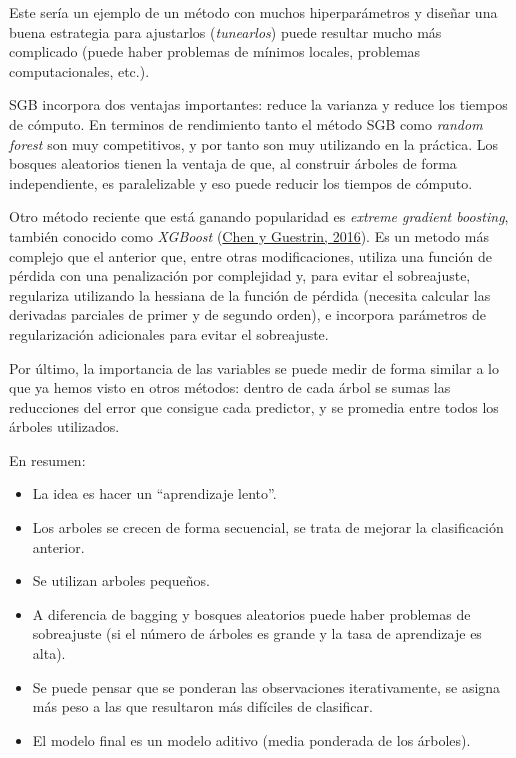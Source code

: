 \documentclass[
  spanish,
]{book}
\theoremstyle{break}
\theoremstyle{definition}
\theoremstyle{definition}
\theoremstyle{definition}
\theoremstyle{definition}
\theoremstyle{remark}
\begin{document}
Este sería un ejemplo de un método con muchos hiperparámetros y diseñar una buena estrategia para ajustarlos (\emph{tunearlos}) puede resultar mucho más complicado (puede haber problemas de mínimos locales, problemas computacionales, etc.).

SGB incorpora dos ventajas importantes: reduce la varianza y reduce los tiempos de cómputo.
En terminos de rendimiento tanto el método SGB como \emph{random forest} son muy competitivos, y por tanto son muy utilizando en la práctica.
Los bosques aleatorios tienen la ventaja de que, al construir árboles de forma independiente, es paralelizable y eso puede reducir los tiempos de cómputo.

Otro método reciente que está ganando popularidad es \emph{extreme gradient boosting}, también conocido como \emph{XGBoost} (\protect\hyperlink{ref-chen2016xgboost}{Chen y Guestrin, 2016}).
Es un metodo más complejo que el anterior que, entre otras modificaciones, utiliza una función de pérdida con una penalización por complejidad y, para evitar el sobreajuste, regulariza utilizando la hessiana de la función de pérdida (necesita calcular las derivadas parciales de primer y de segundo orden), e incorpora parámetros de regularización adicionales para evitar el sobreajuste.

Por último, la importancia de las variables se puede medir de forma similar a lo que ya hemos visto en otros métodos: dentro de cada árbol se sumas las reducciones del error que consigue cada predictor, y se promedia entre todos los árboles utilizados.

En resumen:

\begin{itemize}
\item
  La idea es hacer un ``aprendizaje lento''.
\item
  Los arboles se crecen de forma secuencial, se trata de mejorar la
  clasificación anterior.
\item
  Se utilizan arboles pequeños.
\item
  A diferencia de bagging y bosques aleatorios puede haber problemas de sobreajuste (si el número de árboles es grande y la tasa de aprendizaje es alta).
\item
  Se puede pensar que se ponderan las observaciones iterativamente, se
  asigna más peso a las que resultaron más difíciles de clasificar.
\item
  El modelo final es un modelo aditivo (media ponderada de los
  árboles).
\end{itemize}
\end{document}

